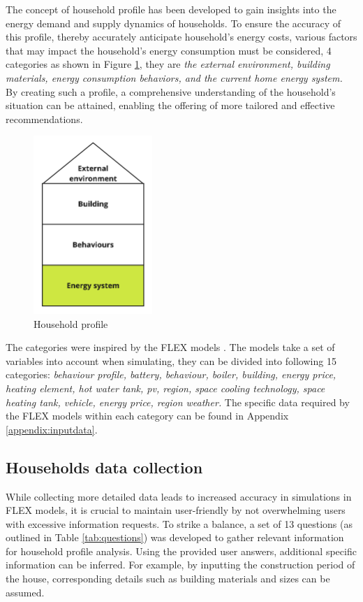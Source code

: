 The concept of household profile has been developed to gain insights into the energy demand and supply dynamics of households. 
To ensure the accuracy of this profile, thereby accurately anticipate household's energy costs, 
various factors that may impact the household's energy consumption must be considered, 4 categories as shown in Figure \ref{fig:profile}, they are 
\emph{the external environment, building materials, energy consumption behaviors, and the current home energy system.}
By creating such a profile, a comprehensive understanding of the household's situation can be attained, enabling the offering of more tailored and effective recommendations.
\begin{figure}[h]
  \centering
  \includegraphics[width=0.4\textwidth]{Images/household_profile.jpg}
  \caption{Household profile}
  \label{fig:profile}
\end{figure}

The categories were inspired by the FLEX models \cite{newtrends}.
The models take a set of variables into account when simulating, they can be divided into following 15 categories: 
\emph{
    behaviour profile,
    battery,
    behaviour, 
    boiler,
    building,
    energy price,
    heating element, 
    hot water tank,
    \gls{pv},
    region,
    space cooling technology,
    space heating tank,
    vehicle,
    energy price,
    region weather. 
}
The specific data required by the FLEX models within each category can be found in Appendix \ref{appendix:inputdata}. 


\subsection{Households data collection}

While collecting more detailed data leads to increased accuracy in simulations in FLEX models, it is crucial to maintain user-friendly by not overwhelming users with excessive information requests. 
To strike a balance, a set of 13 questions (as outlined in Table \ref{tab:questions}) was developed to gather relevant information for household profile analysis. 
Using the provided user answers, additional specific information can be inferred. 
For example, by inputting the construction period of the house, corresponding details such as building materials and sizes can be assumed. 


